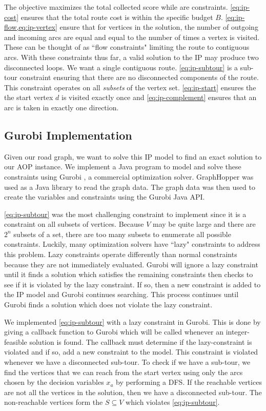 \documentclass[honors]{union-cs-thesis}
\newcommand{\sse}{\subseteq} %
\begin{document}
The objective maximizes the total collected score while  are constraints. \cref{eq:ip-cost} ensures that the total route cost is within the specific budget $B$. \cref{eq:ip-flow,eq:ip-vertex} ensure that for vertices in the solution, the number of outgoing and incoming arcs are equal and equal to the number of times a vertex is visited. These can be thought of as ``flow constraints" limiting the route to contiguous arcs. With these constraints thus far, a valid solution to the IP may produce two disconnected loops. We want a single contiguous route. \cref{eq:ip-subtour} is a sub-tour constraint ensuring that there are no disconnected components of the route. This constraint operates on all \emph{subsets} of the vertex set. \cref{eq:ip-start} ensures the the start vertex $d$ is visited exactly once and  \cref{eq:ip-complement} ensures that an arc is taken in exactly one direction.
 
\subsection{Gurobi Implementation}
Given our road graph, we want to solve this IP model to find an exact solution to our AOP instance. We implement a Java program to model and solve these constraints using Gurobi \cite{gurobi}, a commercial optimization solver. GraphHopper was used as a Java library to read the graph data. The graph data was then used to create the variables and constraints using the Gurobi Java API. 

\cref{eq:ip-subtour} was the most challenging constraint to implement since it is a constraint on all subsets of vertices. Because $V$ may be quite large and there are $2^n$ subsets of a set, there are too many subsets to enumerate all possible constraints. Luckily, many optimization solvers have ``lazy" constraints to address this problem. Lazy constraints operate differently than normal constraints because they are not immediately evaluated. Gurobi will ignore a lazy constraint until it finds a solution which satisfies the remaining constraints then checks to see if it is violated by the lazy constraint. If so, then a new constraint is added to the IP model and Gurobi continues searching. This process continues until Gurobi finds a solution which does not violate the lazy constraint.
 
We implemented \cref{eq:ip-subtour} with a lazy constraint in Gurobi. This is done by giving a callback function to Gurobi which will be called whenever an integer-feasible solution is found. The callback must determine if the lazy-constraint is violated and if so, add a new constraint to the model. This constraint is violated whenever we have a disconnected sub-tour. To check if we have a sub-tour, we find the vertices that we can reach from the start vertex using only the arcs chosen by the decision variables $x_a$ by performing a DFS. If the reachable vertices are not all the vertices in the solution, then we have a disconnected sub-tour. The non-reachable vertices form the $S \sse V$ which violates \cref{eq:ip-subtour}.
\end{document}
